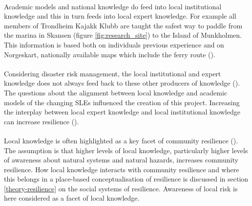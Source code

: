 \paragraph{}

Academic models and national knowledge do feed into local institutional knowledge and this in turn feeds into local expert knowledge. For example all members of Trondheim Kajakk Klubb are taught the safest way to paddle from the marina in Skansen (figure \ref{fig:research_site}) to the Island of Munkholmen. This information is based both on individuals previous experience and on Norgeskart, nationally available maps which include the ferry route (\cite{kartverket_norgeskart_2023}). 

\paragraph{}
Considering disaster risk management, the local institutional and expert knowledge does not always feed back to these other producers of knowledge (\cite{rod_integrated_2012}). The questions about the alignment between local knowledge and academic models of the changing SLEs influenced the creation of this project. Increasing the interplay between local expert knowledge and local institutional knowledge can increase resilience (\cite{setten_we_2019}).

\paragraph{}

Local knowledge is often highlighted as a key facet of community resilience (\cite{setten_we_2019}). The assumption is that higher levels of local knowledge, particularly higher levels of awareness about natural systems and natural hazards, increases community resilience. How local knowledge interacts with community resilience and where this belongs in a place-based conceptualisation of resilience is discussed in section \ref{theory-resilience} on the social systems of resilience. Awareness of local risk is here considered as a facet of local knowledge.  


 
